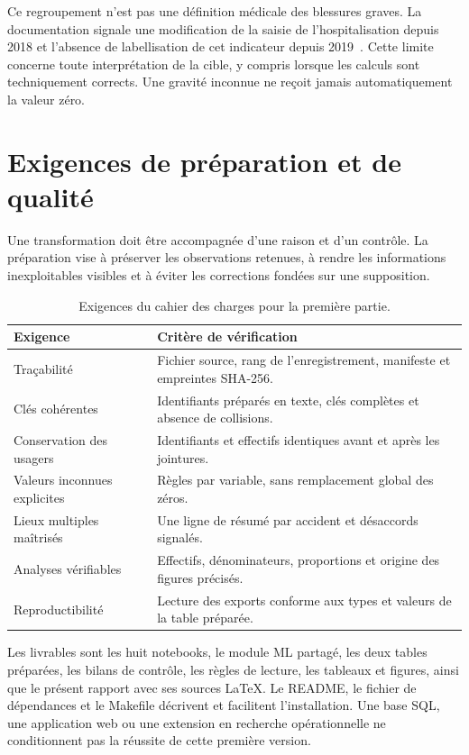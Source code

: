 Ce regroupement n'est pas une définition médicale des blessures graves. La documentation
signale une modification de la saisie de l'hospitalisation depuis 2018 et l'absence de
labellisation de cet indicateur depuis 2019~\cite{doc-onisr}. Cette limite concerne toute
interprétation de la cible, y compris lorsque les calculs sont techniquement corrects.
Une gravité inconnue ne reçoit jamais automatiquement la valeur zéro.

\section{Exigences de préparation et de qualité}
Une transformation doit être accompagnée d'une raison et d'un contrôle. La préparation
vise à préserver les observations retenues, à rendre les informations inexploitables
visibles et à éviter les corrections fondées sur une supposition.

\begin{table}[htbp]\centering\small\renewcommand{\arraystretch}{1.2}
\caption{Exigences du cahier des charges pour la première partie.}\label{tab:exigences}
\begin{tabularx}{\textwidth}{@{}LL@{}}\toprule
Exigence & Critère de vérification\\\midrule
Traçabilité & Fichier source, rang de l'enregistrement, manifeste et empreintes SHA-256.\\
Clés cohérentes & Identifiants préparés en texte, clés complètes et absence de collisions.\\
Conservation des usagers & Identifiants et effectifs identiques avant et après les jointures.\\
Valeurs inconnues explicites & Règles par variable, sans remplacement global des zéros.\\
Lieux multiples maîtrisés & Une ligne de résumé par accident et désaccords signalés.\\
Analyses vérifiables & Effectifs, dénominateurs, proportions et origine des figures précisés.\\
Reproductibilité & Lecture des exports conforme aux types et valeurs de la table préparée.\\\bottomrule
\end{tabularx}
\end{table}

Les livrables sont les huit notebooks, le module ML partagé, les deux tables préparées,
les bilans de contrôle, les règles de lecture, les tableaux et figures, ainsi que
le présent rapport avec ses sources LaTeX. Le README, le fichier de dépendances et
le Makefile décrivent et facilitent l'installation. Une base SQL, une application web ou une extension en recherche
opérationnelle ne conditionnent pas la réussite de cette première version.

